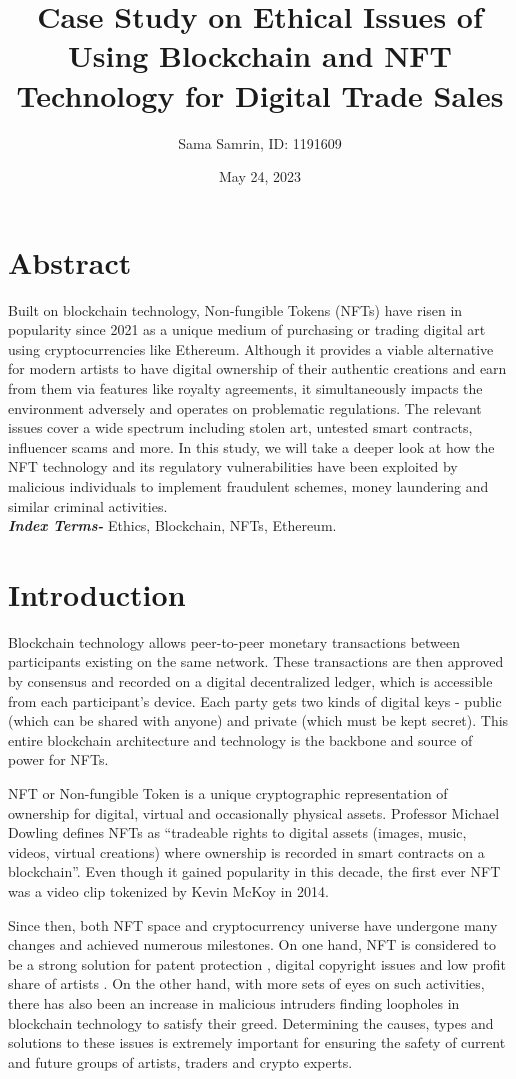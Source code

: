 \documentclass{article}
\title{Case Study on Ethical Issues of Using Blockchain and NFT Technology for Digital Trade Sales}
\author{Sama Samrin, ID: 1191609}
\date{May 24, 2023}
\begin{document}
\maketitle

\section{Abstract}
Built on blockchain technology, Non-fungible Tokens (NFTs) have risen in popularity since 2021 as a unique medium of purchasing or trading digital art using cryptocurrencies like Ethereum. Although it provides a viable alternative for modern artists to have digital ownership of their authentic creations and earn from them via features like royalty agreements, it simultaneously impacts the environment adversely and operates on problematic regulations. The relevant issues cover a wide spectrum including stolen art, untested smart contracts, influencer scams and more. In this study, we will take a deeper look at how the NFT technology and its regulatory vulnerabilities have been exploited by malicious individuals to implement fraudulent schemes, money laundering and similar criminal activities.
\\\textit{\textbf{Index Terms-}} Ethics, Blockchain, NFTs, Ethereum.

\section{Introduction}
Blockchain technology allows peer-to-peer monetary transactions between participants existing on the same network. These transactions are then approved by consensus and recorded on a digital decentralized ledger, which is accessible from each participant’s device. Each party gets two kinds of digital keys - public (which can be shared with anyone) and private (which must be kept secret). This entire blockchain architecture and technology is the backbone and source of power for NFTs.

NFT or Non-fungible Token is a unique cryptographic representation of ownership for digital, virtual and occasionally physical assets. Professor Michael Dowling \cite{DOWLING2022102097} defines NFTs as “tradeable rights to digital assets (images, music, videos, virtual creations) where ownership is recorded in smart contracts on a blockchain”. Even though it gained popularity in this decade, the first ever NFT was a video clip tokenized by Kevin McKoy in 2014. \cite{9803425}

Since then, both NFT space and cryptocurrency universe have undergone many changes and achieved numerous milestones.  On one hand, NFT is considered to be a strong solution for patent protection \cite{barakat2022use}, digital copyright issues \cite{Rafli_2022} and low profit share of artists \cite{Chainalysis}. On the other hand, with more sets of eyes on such activities, there has also been an increase in malicious intruders finding loopholes in blockchain technology to satisfy their greed. Determining the causes, types and solutions to these issues is extremely important for ensuring  the safety of current and future groups of artists, traders and crypto experts.
\end{document}
